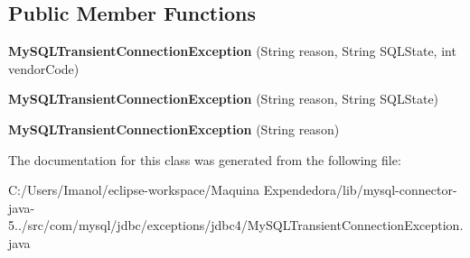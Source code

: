 \subsection*{Public Member Functions}
\begin{DoxyCompactItemize}
\item 
\mbox{\label{classcom_1_1mysql_1_1jdbc_1_1exceptions_1_1jdbc4_1_1_my_s_q_l_transient_connection_exception_a31f839b232588c3b93e22f41f8d350a9}} 
{\bfseries My\+S\+Q\+L\+Transient\+Connection\+Exception} (String reason, String S\+Q\+L\+State, int vendor\+Code)
\item 
\mbox{\label{classcom_1_1mysql_1_1jdbc_1_1exceptions_1_1jdbc4_1_1_my_s_q_l_transient_connection_exception_a9d15e01b039fbda436d662082e806c89}} 
{\bfseries My\+S\+Q\+L\+Transient\+Connection\+Exception} (String reason, String S\+Q\+L\+State)
\item 
\mbox{\label{classcom_1_1mysql_1_1jdbc_1_1exceptions_1_1jdbc4_1_1_my_s_q_l_transient_connection_exception_aaa405524ee9b80a13b192d59766054ed}} 
{\bfseries My\+S\+Q\+L\+Transient\+Connection\+Exception} (String reason)
\end{DoxyCompactItemize}


The documentation for this class was generated from the following file\+:\begin{DoxyCompactItemize}
\item 
C\+:/\+Users/\+Imanol/eclipse-\/workspace/\+Maquina Expendedora/lib/mysql-\/connector-\/java-\/5../src/com/mysql/jdbc/exceptions/jdbc4/My\+S\+Q\+L\+Transient\+Connection\+Exception.\+java\end{DoxyCompactItemize}

